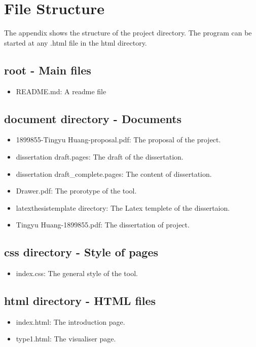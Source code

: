 \chapter{File Structure}
\label{chap:Appendix:A}
The appendix shows the structure of the project directory. The program can be started at any .html file in the html directory.
\section{root - \textbf{Main files}}
\label{sec:Appendix:root}
\begin{itemize}
    \item README.md: A readme file
\end{itemize}

\section{document \textbf{directory} - \textbf{Documents}}
\label{sec:Appendix:docs}

\begin{itemize}
    \item 1899855-Tingyu Huang-proposal.pdf: The proposal of the project.
    \item dissertation draft.pages: The draft of the dissertation.
    \item dissertation draft\_complete.pages: The content of dissertation.
    \item Drawer.pdf: The prorotype of the tool.
    \item latexthesistemplate directory: The Latex templete of the dissertaion. 
    \item Tingyu Huang-1899855.pdf: The dissertation of project.
\end{itemize}

\section{css \textbf{directory} - \textbf{Style of pages}}
\label{sec:Appendix:css}
\begin{itemize}
    \item index.css: The general style of the tool.
\end{itemize}

\section{html \textbf{directory} - \textbf{HTML files}}
\label{sec:Appendix:html}
\begin{itemize}
    \item index.html: The introduction page.
    \item type1.html: The visualiser page.
\end{itemize}

